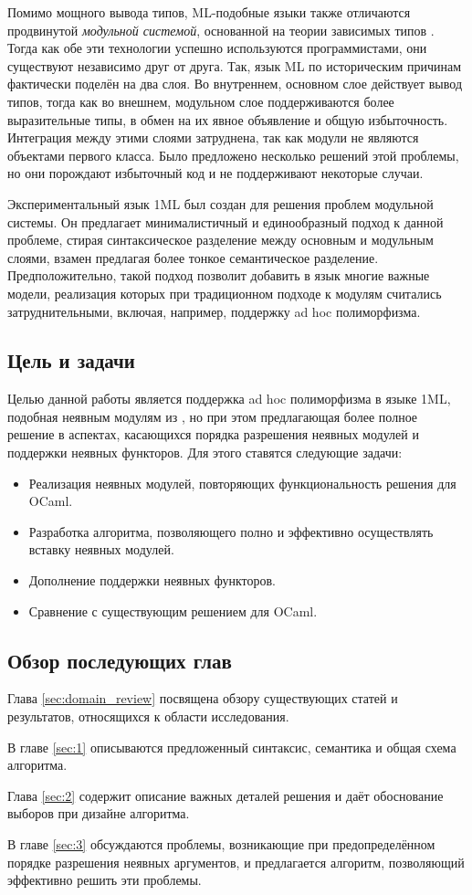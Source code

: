 \documentclass[../diploma.tex]{subfiles}
\begin{document}
Помимо мощного вывода типов, ML-подобные языки также отличаются продвинутой \textit{модульной системой}, основанной на теории зависимых типов \cite{dependent_types}. Тогда как обе эти технологии успешно используются программистами, они существуют независимо друг от друга. Так, язык ML по историческим причинам фактически поделён на два слоя. Во внутреннем, основном слое действует вывод типов, тогда как во внешнем, модульном слое поддерживаются более выразительные типы, в обмен на их явное объявление и общую избыточность. Интеграция между этими слоями затруднена, так как модули не являются объектами первого класса. Было предложено несколько решений этой проблемы, но они порождают избыточный код и не поддерживают некоторые случаи.

Экспериментальный язык 1ML \cite{1ml} был создан для решения проблем модульной системы. Он предлагает минималистичный и единообразный подход к данной проблеме, стирая синтаксическое разделение между основным и модульным слоями, взамен предлагая более тонкое семантическое разделение. Предположительно, такой подход позволит добавить в язык многие важные модели, реализация которых при традиционном подходе к модулям считались затруднительными, включая, например, поддержку ad hoc полиморфизма.

\subsection*{Цель и задачи}

Целью данной работы является поддержка ad hoc полиморфизма в языке 1ML, подобная неявным модулям из \cite{white}, но при этом предлагающая более полное решение в аспектах, касающихся порядка разрешения неявных модулей и поддержки неявных функторов. Для этого ставятся следующие задачи:

\begin{itemize}
	\item Реализация неявных модулей, повторяющих функциональность решения \cite{white} для OCaml.
	\item Разработка алгоритма, позволяющего полно и эффективно осуществлять вставку неявных модулей.
	\item Дополнение поддержки неявных функторов.
	\item Сравнение с существующим решением \cite{white} для OCaml.
\end{itemize}

\subsection*{Обзор последующих глав}

Глава \ref{sec:domain_review} посвящена обзору существующих статей и результатов, относящихся к области исследования. 

В главе \ref{sec:1} описываются предложенный синтаксис, семантика и общая схема алгоритма.

Глава \ref{sec:2} содержит описание важных деталей решения и даёт обоснование выборов при дизайне алгоритма.

В главе \ref{sec:3} обсуждаются проблемы, возникающие при предопределённом порядке разрешения неявных аргументов, и предлагается алгоритм, позволяющий эффективно решить эти проблемы.
\end{document}
